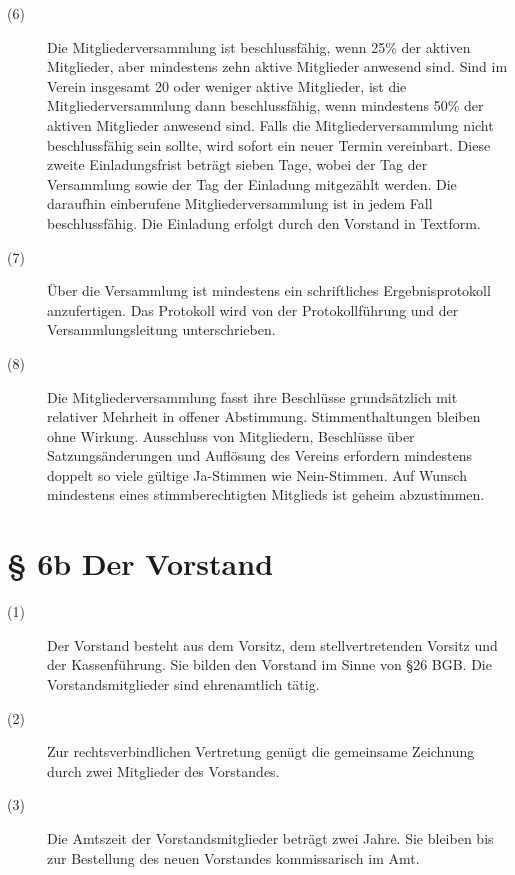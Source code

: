 \documentclass[a4paper,12pt]{scrartcl}
\begin{document}
\begin{description}
\item[(6)] Die Mitgliederversammlung ist beschlussfähig, wenn 25\% der aktiven Mitglieder, aber mindestens zehn aktive Mitglieder anwesend sind. 
Sind im Verein insgesamt 20 oder weniger aktive Mitglieder, ist die Mitgliederversammlung dann beschlussfähig, wenn mindestens 50\% der aktiven Mitglieder anwesend sind.
Falls die Mitgliederversammlung nicht beschlussfähig sein sollte, wird sofort ein neuer Termin vereinbart. Diese zweite Einladungsfrist beträgt sieben Tage, wobei der Tag der Versammlung sowie der Tag der Einladung mitgezählt werden. Die daraufhin einberufene Mitgliederversammlung ist in jedem Fall beschlussfähig. Die Einladung erfolgt durch den Vorstand in Textform.
\item[(7)] Über die Versammlung ist mindestens ein schriftliches Ergebnisprotokoll anzufertigen. Das Protokoll wird von der Protokollführung und der Versammlungsleitung unterschrieben.
\item[(8)] Die Mitgliederversammlung fasst ihre Beschlüsse grundsätzlich mit relativer Mehrheit in offener Abstimmung. Stimmenthaltungen bleiben ohne Wirkung. Ausschluss von Mitgliedern, Beschlüsse über Satzungsänderungen und Auflösung des Vereins erfordern mindestens doppelt so viele gültige Ja-Stimmen wie Nein-Stimmen. Auf Wunsch mindestens eines stimmberechtigten Mitglieds ist geheim abzustimmen.

\end{description}



\section*{\S{} 6b Der Vorstand}
\begin{description} 

\item[(1)] Der Vorstand besteht aus dem Vorsitz, dem stellvertretenden Vorsitz und der Kassenführung. Sie bilden den Vorstand im Sinne von §26 BGB. Die Vorstandsmitglieder sind ehrenamtlich tätig.
\item[(2)] Zur rechtsverbindlichen Vertretung genügt die gemeinsame Zeichnung durch zwei Mitglieder des Vorstandes.
\item[(3)] Die Amtszeit der Vorstandsmitglieder beträgt zwei Jahre. Sie bleiben bis zur Bestellung des neuen Vorstandes kommissarisch im Amt.

\end{description}
\end{document}
